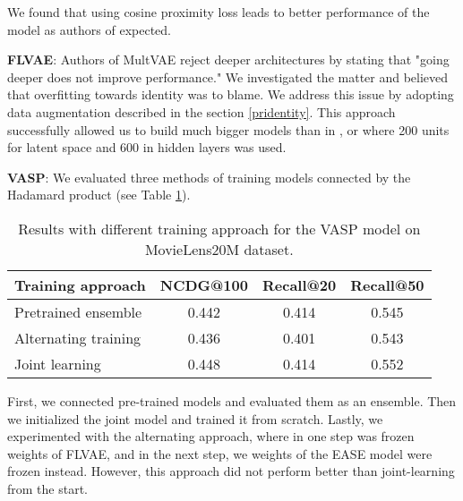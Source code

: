\documentclass[conference]{IEEEtran}
\begin{document}
    \noindent
    We found that using cosine proximity loss leads to better performance of the model as authors of \cite{Steck2019} expected.
    
    \textbf{FLVAE}: Authors of MultVAE reject deeper architectures by stating that "going deeper does not improve performance." We investigated the matter and believed that overfitting towards identity was to blame. We address this issue by adopting data augmentation described in the section \ref{pridentity}. This approach successfully allowed us to build much bigger models than in \cite{Liang2018}, \cite{Shenbin2020} or \cite{Kim2019} where 200 units for latent space and 600 in hidden layers was used.
    


    \textbf{VASP}: We evaluated three methods of training models connected by the Hadamard product (see Table \ref{tab:3}). 
    
    \begin{table}[h]\label{tab:3}\caption{Results with different training approach for the VASP model on MovieLens20M dataset.}
        \centering
        \begin{tabular}{@{}llll@{}}
            \toprule
            Training approach & NCDG@100 & Recall@20 & Recall@50 \\ 
            \midrule
            Pretrained ensemble  & \multicolumn{1}{c}{0.442} & \multicolumn{1}{c}{0.414} & \multicolumn{1}{c}{0.545}           \\
            Alternating training & \multicolumn{1}{c}{0.436} & \multicolumn{1}{c}{0.401} & \multicolumn{1}{c}{0.543} \\
            Joint learning &   \multicolumn{1}{c}{0.448} & \multicolumn{1}{c}{0.414} & \multicolumn{1}{c}{0.552}             \\ 
            \bottomrule
        \end{tabular}
        \centering
    \end{table}
    
  
    
    First, we connected pre-trained models and evaluated them as an ensemble. Then we initialized the joint model and trained it from scratch. Lastly, we experimented with the alternating approach, where in one step was frozen weights of FLVAE, and in the next step, we weights of the EASE model were frozen instead. However, this approach did not perform better than joint-learning from the start.
    
\end{document}
